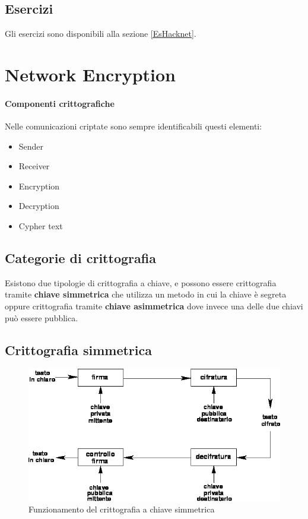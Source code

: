 \subsection{Esercizi}

Gli esercizi sono disponibili alla sezione \ref{EsHacknet}.


\section{Network Encryption}

\paragraph*{Componenti crittografiche}
Nelle comunicazioni criptate sono sempre identificabili questi elementi:
\begin{itemize}
\item Sender
\item Receiver
\item Encryption
\item Decryption
\item Cypher text
\end{itemize}


\subsection{Categorie di crittografia}

Esistono due tipologie di crittografia a chiave, e possono essere crittografia 
tramite \textbf{chiave simmetrica} che utilizza un metodo in cui la chiave è 
segreta oppure crittografia tramite \textbf{chiave asimmetrica} dove invece una 
delle due chiavi può essere pubblica.

\subsection{Crittografia simmetrica}

\begin{figure}[H]
\centering
\includegraphics[scale=0.4]{res/img/symmetric.png}
\caption{Funzionamento del crittografia a chiave simmetrica}
\label{fig:password:symmetric}
\end{figure}

